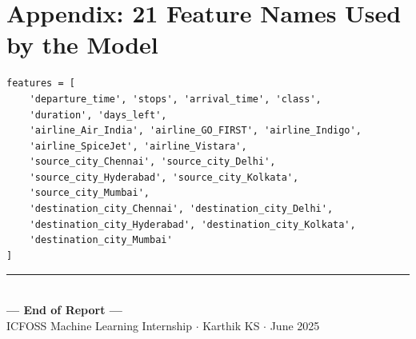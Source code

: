 \documentclass[12pt, a4paper]{article}
\begin{document}
\section{Appendix: 21 Feature Names Used by the Model}

\begin{lstlisting}[style=pythonstyle, caption={Feature Names (21 total)}]
features = [
    'departure_time', 'stops', 'arrival_time', 'class',
    'duration', 'days_left',
    'airline_Air_India', 'airline_GO_FIRST', 'airline_Indigo',
    'airline_SpiceJet', 'airline_Vistara',
    'source_city_Chennai', 'source_city_Delhi',
    'source_city_Hyderabad', 'source_city_Kolkata',
    'source_city_Mumbai',
    'destination_city_Chennai', 'destination_city_Delhi',
    'destination_city_Hyderabad', 'destination_city_Kolkata',
    'destination_city_Mumbai'
]
\end{lstlisting}

\vfill
\begin{center}
    \rule{0.5\textwidth}{0.5pt}\\[0.5cm]
    {\large\textbf{--- End of Report ---}}\\[0.3cm]
    {\normalsize ICFOSS Machine Learning Internship $\cdot$ Karthik KS $\cdot$ June 2025}
\end{center}
\end{document}

